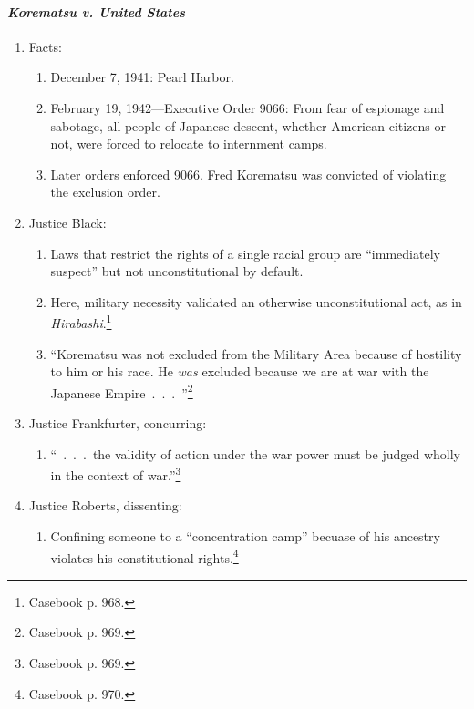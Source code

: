 \paragraph{\emph{Korematsu v. United States}}

\begin{enumerate}
    \item Facts:
    \begin{enumerate}
        \item December 7, 1941: Pearl Harbor.
        \item February 19, 1942---Executive Order 9066: From fear of espionage 
        and sabotage, all people of Japanese descent, whether American 
        citizens or not, were forced to relocate to internment camps.
        \item Later orders enforced 9066. Fred Korematsu was convicted of 
        violating the exclusion order.
    \end{enumerate}
    \item Justice Black:
    \begin{enumerate}
        \item Laws that restrict the rights of a single racial group are 
        ``immediately suspect'' but not unconstitutional by default.
        \item Here, military necessity validated an otherwise 
        unconstitutional act, as in \emph{Hirabashi}.\footnote{Casebook p. 
        968.}
        \item ``Korematsu was not excluded from the Military Area because 
        of hostility to him or his race. He \emph{was} excluded because 
        we are at war with the Japanese Empire~.~.~.~''\footnote{Casebook 
        p. 969.}
    \end{enumerate}
    \item Justice Frankfurter, concurring:
    \begin{enumerate}
        \item ``~.~.~.~the validity of action under the war power must be 
        judged wholly in the context of war.''\footnote{Casebook p. 969.}
    \end{enumerate}
    \item Justice Roberts, dissenting:
    \begin{enumerate}
        \item Confining someone to a ``concentration camp'' becuase of his 
        ancestry violates his constitutional rights.\footnote{Casebook p. 
        970.}
    \end{enumerate}

\end{enumerate}
